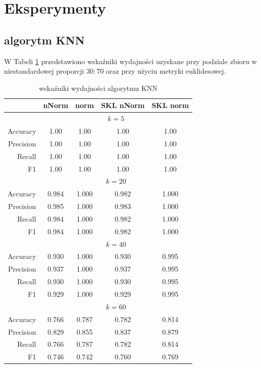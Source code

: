 \documentclass[12pt,a4paper]{article}
\begin{document}
	\section{Eksperymenty}
	
        \subsection{algorytm KNN}
        
            W Tabeli \ref{tab:KNN} przedstawiono wskaźniki wydajności uzyskane przy podziale zbioru w niestandardowej proporcji $30:70$ oraz przy użyciu metryki euklidesowej.
            \begin{table}[h!]
        	    \centering
        	    \begin{tabular}{r || c | c | c | c}
        	        & nNorm & norm & SKL nNorm & SKL norm\\
        	        \hline
                    ~ & \multicolumn{4}{c}{$k=5$}\\
                    \hline
                    Accuracy & 1.00 & 1.00 & 1.00 & 1.00\\
                    Precision & 1.00 & 1.00 & 1.00 & 1.00\\
                    Recall & 1.00 & 1.00 & 1.00 & 1.00\\
                    F1 & 1.00 & 1.00 & 1.00 & 1.00\\
                    \hline \hline
                    ~ & \multicolumn{4}{c}{$k=20$}\\
                    \hline
                    Accuracy & 0.984 & 1.000 & 0.982 & 1.000\\
                    Precision & 0.985 & 1.000 & 0.983 & 1.000\\
                    Recall &  0.984 & 1.000 & 0.982 & 1.000\\
                    F1 &  0.984 & 1.000 & 0.982 & 1.000\\
                    \hline \hline
                    ~ & \multicolumn{4}{c}{$k=40$}\\
                    \hline
                    Accuracy & 0.930 & 1.000 & 0.930 & 0.995\\
                    Precision & 0.937 & 1.000 & 0.937 & 0.995\\
                    Recall & 0.930 & 1.000 & 0.930 & 0.995\\
                    F1 & 0.929 & 1.000 & 0.929 & 0.995\\
                    \hline \hline
                    ~ & \multicolumn{4}{c}{$k=60$}\\
                    \hline
                    Accuracy & 0.766 & 0.787 & 0.782 & 0.814\\
                    Precision & 0.829 & 0.855 & 0.837 & 0.879\\
                    Recall & 0.766 & 0.787 & 0.782 & 0.814\\
                    F1 & 0.746 & 0.742 & 0.760 & 0.769\\
                \end{tabular}
        	    \caption{wskaźniki wydajności algorytmu KNN}
        	    \label{tab:KNN}
        	\end{table}
\end{document}
